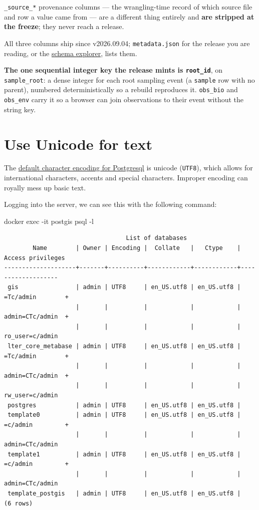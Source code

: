 \documentclass[
  letterpaper,
  DIV=11,
  numbers=noendperiod]{scrreprt}
\newenvironment{Shaded}{\begin{snugshade}}{\end{snugshade}}
\newcommand{\AttributeTok}[1]{\textcolor[rgb]{0.40,0.45,0.13}{#1}}
\newcommand{\ExtensionTok}[1]{\textcolor[rgb]{0.00,0.23,0.31}{#1}}
\newcommand{\NormalTok}[1]{\textcolor[rgb]{0.00,0.23,0.31}{#1}}
\begin{document}
\texttt{\_source\_*} provenance columns --- the wrangling-time record of
which source file and row a value came from --- are a different thing
entirely and \textbf{are stripped at the freeze}; they never reach a
release.

All three columns ship since v2026.09.04; \texttt{metadata.json} for the
release you are reading, or the
\href{https://calcofi.io/db-schema/}{schema explorer}, lists them.

\textbf{The one sequential integer key the release mints is
\texttt{root\_id}}, on \texttt{sample\_root}: a dense integer for each
root sampling event (a \texttt{sample} row with no parent), numbered
deterministically so a rebuild reproduces it. \texttt{obs\_bio} and
\texttt{obs\_env} carry it so a browser can join observations to their
event without the string key.

\section{Use Unicode for text}\label{use-unicode-for-text}

The
\href{https://www.postgresql.org/docs/current/multibyte.html\#MULTIBYTE-SETTING}{default
character encoding for Postgresql} is unicode (\texttt{UTF8}), which
allows for international characters, accents and special characters.
Improper encoding can royally mess up basic text.

Logging into the server, we can see this with the following command:

\begin{Shaded}
\begin{Highlighting}[]
\ExtensionTok{docker}\NormalTok{ exec }\AttributeTok{{-}it}\NormalTok{ postgis psql }\AttributeTok{{-}l}
\end{Highlighting}
\end{Shaded}

\begin{verbatim}
                                  List of databases
        Name        | Owner | Encoding |  Collate   |   Ctype    | Access privileges 
--------------------+-------+----------+------------+------------+-------------------
 gis                | admin | UTF8     | en_US.utf8 | en_US.utf8 | =Tc/admin        +
                    |       |          |            |            | admin=CTc/admin  +
                    |       |          |            |            | ro_user=c/admin
 lter_core_metabase | admin | UTF8     | en_US.utf8 | en_US.utf8 | =Tc/admin        +
                    |       |          |            |            | admin=CTc/admin  +
                    |       |          |            |            | rw_user=c/admin
 postgres           | admin | UTF8     | en_US.utf8 | en_US.utf8 | 
 template0          | admin | UTF8     | en_US.utf8 | en_US.utf8 | =c/admin         +
                    |       |          |            |            | admin=CTc/admin
 template1          | admin | UTF8     | en_US.utf8 | en_US.utf8 | =c/admin         +
                    |       |          |            |            | admin=CTc/admin
 template_postgis   | admin | UTF8     | en_US.utf8 | en_US.utf8 | 
(6 rows)
\end{verbatim}
\end{document}
